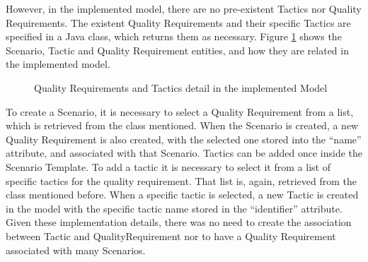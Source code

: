 \documentclass{llncs}
\begin{document}
However, in the implemented model, there are no pre-existent Tactics nor Quality Requirements. The existent Quality Requirements and their specific Tactics are specified in a Java class, which returns them as necessary. Figure \ref{figure:modelQRTactics} shows the Scenario, Tactic and Quality Requirement entities, and how they are related in the implemented model.

\begin{figure}
\centering
\renewcommand {\umltextcolor}{black}
\renewcommand {\umlfillcolor}{none}
\renewcommand {\umldrawcolor}{black}

\caption{Quality Requirements and Tactics detail in the implemented Model}
\label{figure:modelQRTactics}
\end{figure}

To create a Scenario, it is necessary to select a Quality Requirement from a list, which is retrieved from the class mentioned. When the Scenario is created, a new Quality Requirement is also created, with the selected one stored into the ``name'' attribute, and associated with that Scenario. Tactics can be added once inside the Scenario Template. To add a tactic it is necessary to select it from a list of specific tactics for the quality requirement. That list is, again, retrieved from the class mentioned before. When a specific tactic is selected, a new Tactic is created in the model with the specific tactic name stored in the ``identifier'' attribute. Given these implementation details, there was no need to create the association between Tactic and QualityRequirement nor to have a Quality Requirement associated with many Scenarios.
\end{document}
